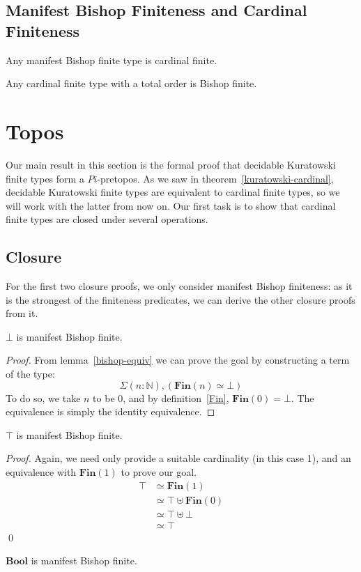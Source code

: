 \subsection{Manifest Bishop Finiteness and Cardinal Finiteness}
\begin{romlemma}
  Any manifest Bishop finite type is cardinal finite.
\end{romlemma}
\begin{romtheorem}
  Any cardinal finite type with a total order is Bishop finite.
\end{romtheorem}
\section{Topos}
Our main result in this section is the formal proof that decidable Kuratowski
finite types form a \(Pi\)-pretopos.
As we saw in theorem~\ref{kuratowski-cardinal}, decidable Kuratowski finite
types are equivalent to cardinal finite types, so we will work with the latter
from now on.
Our first task is to show that cardinal finite types are closed under several
operations.
\subsection{Closure}
For the first two closure proofs, we only consider manifest Bishop finiteness:
as it is the strongest of the finiteness predicates, we can derive the other
closure proofs from it.
\begin{romlemma}
  \(\bot\) is manifest Bishop finite.
\end{romlemma}
\begin{proof}
  From lemma~\ref{bishop-equiv} we can prove the goal by constructing a term of
  the type:
  \begin{equation}
    \Sigma(n : \mathbb{N}) , (\mathbf{Fin}(n) \simeq \bot)
  \end{equation}
  To do so, we take \(n\) to be 0, and by definition~\ref{Fin},
  \(\mathbf{Fin}(0) = \bot\).
  The equivalence is simply the identity equivalence.
\end{proof}
\begin{romlemma}
  \(\top\) is manifest Bishop finite.
\end{romlemma}
\begin{proof}
  Again, we need only provide a suitable cardinality (in this case 1), and an
  equivalence with \(\mathbf{Fin}(1)\) to prove our goal.
  \begin{align*}
    \top &\simeq \mathbf{Fin}(1) \\
          &\simeq \top \uplus \mathbf{Fin}(0) \\
          &\simeq \top \uplus \bot \\
          &\simeq \top
  \end{align*}
  \qed
\end{proof}
\begin{romlemma}
  \(\mathbf{Bool}\) is manifest Bishop finite.
\end{romlemma}

